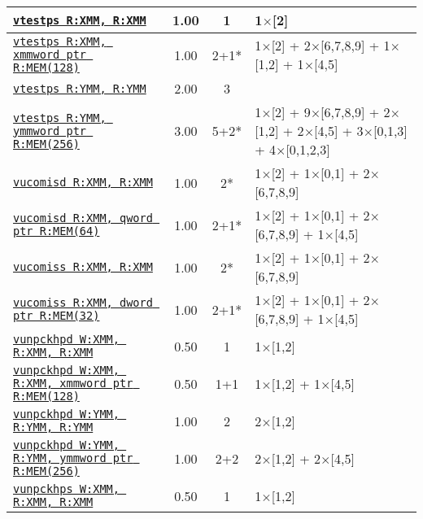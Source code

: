 \documentclass[a4paper,english,fontsize=9]{scrartcl}
\begin{document}
\begin{longtable}{p{}ccL{.25\textwidth}}
  \midrule
  \texttt{\href{https://felixcloutier.com/x86/VTESTPD:VTESTPS.html}{vtestps R:XMM, R:XMM}} & 1.00 & 1 & 1\(\times\)[2] \\
  \midrule
  \texttt{\href{https://felixcloutier.com/x86/VTESTPD:VTESTPS.html}{vtestps R:XMM, xmmword ptr R:MEM(128)}} & 1.00 & 2+1* & 1\(\times\)[2] + 2\(\times\)[6,7,8,9] + 1\(\times\)[1,2] + 1\(\times\)[4,5] \\
  \midrule
  \texttt{\href{https://felixcloutier.com/x86/VTESTPD:VTESTPS.html}{vtestps R:YMM, R:YMM}} & 2.00 & 3 &  \\
  \midrule
  \texttt{\href{https://felixcloutier.com/x86/VTESTPD:VTESTPS.html}{vtestps R:YMM, ymmword ptr R:MEM(256)}} & 3.00 & 5+2* & 1\(\times\)[2] + 9\(\times\)[6,7,8,9] + 2\(\times\)[1,2] + 2\(\times\)[4,5] + 3\(\times\)[0,1,3] + 4\(\times\)[0,1,2,3] \\
  \midrule
  \texttt{\href{https://felixcloutier.com/x86/UCOMISD.html}{vucomisd R:XMM, R:XMM}} & 1.00 & 2* & 1\(\times\)[2] + 1\(\times\)[0,1] + 2\(\times\)[6,7,8,9] \\
  \midrule
  \texttt{\href{https://felixcloutier.com/x86/UCOMISD.html}{vucomisd R:XMM, qword ptr R:MEM(64)}} & 1.00 & 2+1* & 1\(\times\)[2] + 1\(\times\)[0,1] + 2\(\times\)[6,7,8,9] + 1\(\times\)[4,5] \\
  \midrule
  \texttt{\href{https://felixcloutier.com/x86/UCOMISS.html}{vucomiss R:XMM, R:XMM}} & 1.00 & 2* & 1\(\times\)[2] + 1\(\times\)[0,1] + 2\(\times\)[6,7,8,9] \\
  \midrule
  \texttt{\href{https://felixcloutier.com/x86/UCOMISS.html}{vucomiss R:XMM, dword ptr R:MEM(32)}} & 1.00 & 2+1* & 1\(\times\)[2] + 1\(\times\)[0,1] + 2\(\times\)[6,7,8,9] + 1\(\times\)[4,5] \\
  \midrule
  \texttt{\href{https://felixcloutier.com/x86/UNPCKHPD.html}{vunpckhpd W:XMM, R:XMM, R:XMM}} & 0.50 & 1 & 1\(\times\)[1,2] \\
  \midrule
  \texttt{\href{https://felixcloutier.com/x86/UNPCKHPD.html}{vunpckhpd W:XMM, R:XMM, xmmword ptr R:MEM(128)}} & 0.50 & 1+1 & 1\(\times\)[1,2] + 1\(\times\)[4,5] \\
  \midrule
  \texttt{\href{https://felixcloutier.com/x86/UNPCKHPD.html}{vunpckhpd W:YMM, R:YMM, R:YMM}} & 1.00 & 2 & 2\(\times\)[1,2] \\
  \midrule
  \texttt{\href{https://felixcloutier.com/x86/UNPCKHPD.html}{vunpckhpd W:YMM, R:YMM, ymmword ptr R:MEM(256)}} & 1.00 & 2+2 & 2\(\times\)[1,2] + 2\(\times\)[4,5] \\
  \midrule
  \texttt{\href{https://felixcloutier.com/x86/UNPCKHPS.html}{vunpckhps W:XMM, R:XMM, R:XMM}} & 0.50 & 1 & 1\(\times\)[1,2] \\

\end{longtable}
\end{document}
